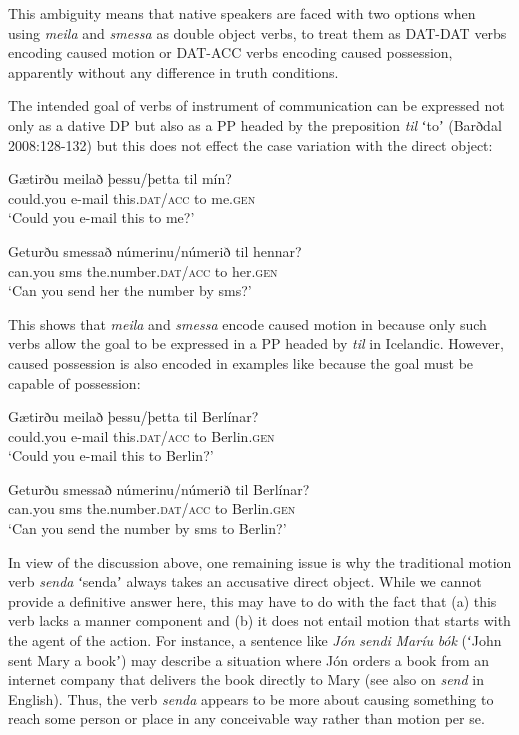 \documentclass[output=paper,modfonts,nonflat,colorlinks,citecolor=brown]{langsci/langscibook}
\begin{document}
This ambiguity means that native speakers are faced with two options when using \textit{meila} and \textit{smessa} as double object verbs, to treat them as DAT-DAT verbs encoding caused motion or DAT-ACC verbs encoding caused possession, apparently without any difference in truth conditions. 

The intended goal of verbs of instrument of communication can be expressed not only as a dative DP but also as a PP headed by the preposition \textit{til} ʻtoʼ (Barðdal 2008:128-132) but this does not effect the case variation with the direct object:

 
\ea%
    \label{ex:jonsson:12}  
\ea
\gll  Gætirðu  meilað  þessu/þetta  til  mín?\\
   could.you  e-mail  this.\textsc{dat/acc}  to  me.\textsc{gen}\\
\glt `Could you e-mail this to me?' 

\ex
\gll   Geturðu  smessað  númerinu/númerið  til  hennar?\\
 can.you  sms  the.number.\textsc{dat/acc}  to  her.\textsc{gen}\\
\glt `Can you send her the number by sms?'
\z
\z

This shows that \textit{meila} and \textit{smessa} encode caused motion in  because only such verbs allow the goal to be expressed in a PP headed by \textit{til} in Icelandic. However, caused possession is also encoded in examples like  because the goal must be capable of possession:

 
\ea%
    \label{ex:jonsson:13}  
\ea
\gll  *Gætirðu  meilað  þessu/þetta  til  Berlínar?\\
   could.you  e-mail  this.\textsc{dat/acc}  to  Berlin.\textsc{gen}\\
\glt `Could you e-mail this to Berlin?' 

\ex
\gll   *Geturðu  smessað  númerinu/númerið  til  Berlínar?\\
 can.you  sms  the.number.\textsc{dat/acc}  to  Berlin.\textsc{gen}\\
\glt `Can you send the number by sms to Berlin?'
\z
\z

In view of the discussion above, one remaining issue is why the traditional motion verb \textit{senda} ʻsendaʼ always takes an accusative direct object. While we cannot provide a definitive answer here, this may have to do with the fact that (a) this verb lacks a manner component and (b) it does not entail motion that starts with the agent of the action. For instance, a sentence like \textit{Jón} \textit{sendi} \textit{Maríu} \textit{bók} (ʻJohn sent Mary a bookʼ) may describe a situation where Jón orders a book from an internet company that delivers the book directly to Mary (see also \citealt{Beavers2011} on \textit{send} in English). Thus, the verb \textit{senda} appears to be more about causing something to reach some person or place in any conceivable way rather than motion per se. 
\end{document}
